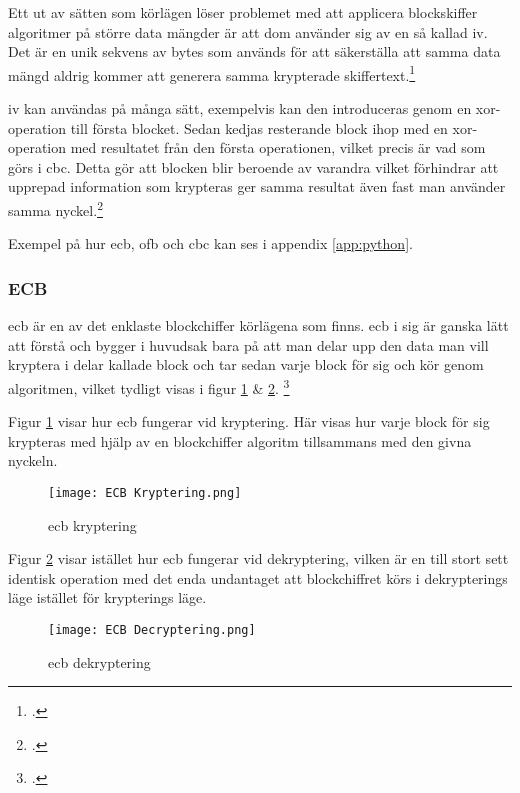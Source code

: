 Ett ut av sätten som körlägen löser problemet med att applicera blockskiffer algoritmer på
större data mängder är att dom använder sig av en så kallad \acrfull{iv}. Det är en unik sekvens
av bytes som används för att säkerställa att samma data mängd aldrig kommer att generera samma
krypterade skiffertext.\footcite{dworkin2001sp}

\acrshort{iv} kan användas på många sätt, exempelvis kan den introduceras genom en
\gls{xor}-operation till första blocket. Sedan kedjas resterande block ihop med en \gls{xor}-operation med resultatet från
den första operationen, vilket precis är vad som görs i \acrshort{cbc}. Detta gör att blocken blir beroende av varandra
vilket förhindrar att upprepad information som krypteras ger samma resultat även fast man använder samma
nyckel.\footcite{dworkin2001sp}

Exempel på hur \acrshort{ecb}, \acrshort{ofb} och \acrshort{cbc} kan ses i appendix \ref{app:python}.

\subsubsection{ECB}
\label{sec:ecb}
\acrfull{ecb} är en av det enklaste blockchiffer körlägena som finns.
\acrshort{ecb} i sig är ganska lätt att förstå och bygger i huvudsak bara på
att man delar upp den data man vill kryptera i delar kallade block och tar sedan varje
block för sig och kör genom algoritmen, vilket tydligt visas i
figur \ref{fig:ecb-mode-enc} \& \ref{fig:ecb-mode-dec}.
\footcite{dworkin2001sp}

Figur \ref{fig:ecb-mode-enc} visar hur \acrshort{ecb} fungerar vid kryptering.
Här visas hur varje block för sig krypteras med hjälp av en blockchiffer algoritm
tillsammans med den givna nyckeln.

\begin{figure}[H]
    \texttt{[image: ECB Kryptering.png]}
    \caption{\acrlong{ecb} kryptering}
    \label{fig:ecb-mode-enc}
\end{figure}

Figur \ref{fig:ecb-mode-dec} visar istället hur \acrshort{ecb} fungerar vid
dekryptering, vilken är en till stort sett identisk operation med det enda undantaget
att blockchiffret körs i dekrypterings läge istället för krypterings läge.

\begin{figure}[H]
    \texttt{[image: ECB Decryptering.png]}
    \caption{\acrlong{ecb} dekryptering}
    \label{fig:ecb-mode-dec}
\end{figure}

